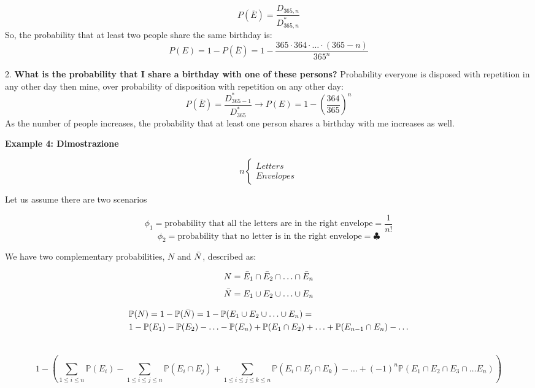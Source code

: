 \[
P(\overline{E}) =  \frac{D_{365, n}}{D^*_{365, n}}
\]
So, the probability that at least two people share the same birthday is:
\[
P(E) = 1 - P(\overline{E}) = 1 - \frac{365 \cdot 364 \cdot \dots \cdot (365 - n)}{365^n}
\]


2. \textbf{What is the probability that I share a birthday with one of these persons?}
Probability everyone is disposed with repetition in any other day then mine, over probability of disposition with repetition on any other day:
\[
P(\overline{E}) =  \frac{D^*_{365-1}}{D^*_{365}} \rightarrow P(E) = 1 - \left(\frac{364}{365}\right)^n
\]
As the number of people increases, the probability that at least one person shares a birthday with me increases as well.

\textbf{Example 4: Dimostrazione}

            \[ n \begin{cases}
                Letters \\
                Envelopes
            \end{cases} \]
        
            Let us assume there are two scenarios
        
            \[ \phi_1 = \text{probability that all the letters are in the right envelope} = \frac{1}{n!} \]
            \[ \phi_2 = \text{probability that no letter is in the right envelope} = \clubsuit \]
        
            We have two complementary probabilities, \(N\) and \(\Bar{N}\), described as:
        
            \[N = \Bar{E}_1 \cap \Bar{E}_2 \cap \ldots \cap \Bar{E}_n\]
            \[\Bar{N} = E_1 \cup E_2 \cup \ldots \cup E_n\]
        
            \begin{equation}
            \begin{split}
               & \mathbb{P} (N) = 1 - \mathbb{P} (\Bar{N}) = 1 - \mathbb{P} (E_1 \cup E_2 \cup \ldots \cup E_n) = \\ & 1 - \mathbb{P} (E_1) - \mathbb{P} (E_2) - \ldots - \mathbb{P} (E_n) + \mathbb{P} (E_1 \cap E_2) + \ldots + \mathbb{P} (E_{n-1} \cap E_n) - \ldots \\ & 
            \end{split}
            \end{equation}

            \begin{equation}
                1 - \left( \sum_{1 \leq i \leq n} \mathbb{P}(E_i) - \sum_{1 \leq i \leq j \leq n} \mathbb{P}(E_i \cap E_j) + \sum_{1 \leq i \leq j \leq k \leq n} \mathbb{P}(E_i \cap E_j \cap E_k) - \ldots + (-1)^n \mathbb{P} (E_1 \cap E_2 \cap E_3 \cap \ldots E_n)  \right)
            \end{equation}


